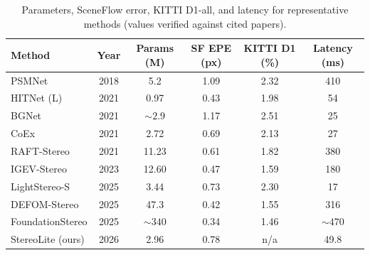 \begin{table}[!htbp]
\centering
\caption{Parameters, SceneFlow error, KITTI D1-all, and latency for representative methods (values verified against cited papers).}
\label{tab:method_comparison}
\small
\begin{tabular}{lccccc}
\toprule
Method & Year & Params (M) & SF EPE (px) & KITTI D1 (\%) & Latency (ms)\\
\midrule
PSMNet \cite{chang2018psmnet} & 2018 & 5.2 & 1.09 & 2.32 & 410\\
HITNet (L) \cite{tankovich2021hitnet} & 2021 & 0.97 & 0.43 & 1.98 & 54\\
BGNet \cite{xu2021bgnet} & 2021 & ${\sim}2.9$ & 1.17 & 2.51 & 25\\
CoEx \cite{bangunharcana2021coex} & 2021 & 2.72 & 0.69 & 2.13 & 27\\
RAFT-Stereo \cite{lipson2021raftstereo} & 2021 & 11.23 & 0.61 & 1.82 & 380\\
IGEV-Stereo \cite{xu2023igev} & 2023 & 12.60 & 0.47 & 1.59 & 180\\
LightStereo-S \cite{guo2025lightstereo} & 2025 & 3.44 & 0.73 & 2.30 & 17\\
DEFOM-Stereo \cite{jiang2025defom} & 2025 & 47.3 & 0.42 & 1.55 & 316\\
FoundationStereo \cite{wen2025foundationstereo} & 2025 & ${\sim}340$ & 0.34 & 1.46 & ${\sim}470$\\
\midrule
StereoLite (ours) & 2026 & 2.96 & 0.78 & n/a & 49.8\\
\bottomrule
\end{tabular}
\end{table}

\FloatBarrier
